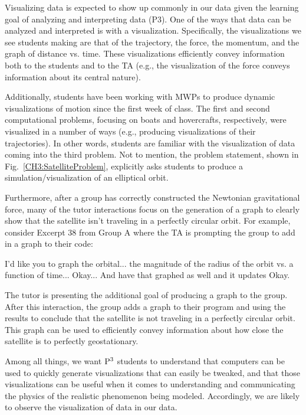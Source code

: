 \documentclass{msuphddissertation}
\begin{document}
\begin{doublespace}
Visualizing data is expected to show up commonly in our data given the learning goal of analyzing and interpreting data (P3).  One of the ways that data can be analyzed and interpreted is with a visualization.  Specifically, the visualizations we see students making are that of the trajectory, the force, the momentum, and the graph of distance vs. time.  These visualizations efficiently convey information both to the students and to the TA (e.g., the visualization of the force conveys information about its central nature).

Additionally, students have been working with MWPs to produce dynamic visualizations of motion since the first week of class.  The first and second computational problems, focusing on boats and hovercrafts, respectively, were visualized in a number of ways (e.g., producing visualizations of their trajectories).  In other words, students are familiar with the visualization of data coming into the third problem.  Not to mention, the problem statement, shown in Fig.~\ref{CH3:SatelliteProblem}, explicitly asks students to produce a simulation/visualization of an elliptical orbit. 

Furthermore, after a group has correctly constructed the Newtonian gravitational force, many of the tutor interactions focus on the generation of a graph to clearly show that the satellite isn't traveling in a perfectly circular orbit.  For example, consider Excerpt 38 from Group A where the TA is prompting the group to add in a graph to their code: \begin{description}
\TA I'd like you to graph the orbital... the magnitude of the radius of the orbit vs. a function of time...
\SC Okay...
\TA And have that graphed as well and it updates
\SC Okay.
\end{description}  The tutor is presenting the additional goal of producing a graph to the group.  After this interaction, the group adds a graph to their program and using the results to conclude that the satellite is not traveling in a perfectly circular orbit.  This graph can be used to efficiently convey information about how close the satellite is to perfectly geostationary.  

Among all things, we want ${\rm P}^{3}$ students to understand that computers can be used to quickly generate visualizations that can easily be tweaked, and that those visualizations can be useful when it comes to understanding and communicating the physics of the realistic phenomenon being modeled.  Accordingly, we are likely to observe the visualization of data in our data.


\end{doublespace}
\end{document}
